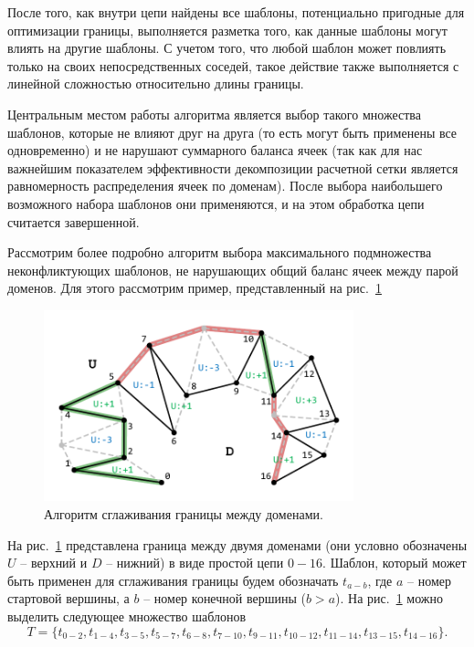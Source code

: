После того, как внутри цепи найдены все шаблоны, потенциально пригодные для оптимизации границы, выполняется разметка того, как данные шаблоны могут влиять на другие шаблоны.
С учетом того, что любой шаблон может повлиять только на своих непосредственных соседей, такое действие также выполняется с линейной сложностью относительно длины границы.

Центральным местом работы алгоритма является выбор такого множества шаблонов, которые не влияют друг на друга (то есть могут быть применены все одновременно) и не нарушают суммарного баланса ячеек (так как для нас важнейшим показателем эффективности декомпозиции расчетной сетки является равномерность распределения ячеек по доменам).
После выбора наибольшего возможного набора шаблонов они применяются, и на этом обработка цепи считается завершенной.

Рассмотрим более подробно алгоритм выбора максимального подмножества неконфликтующих шаблонов, не нарушающих общий баланс ячеек между парой доменов.
Для этого рассмотрим пример, представленный на рис.~\ref{fig:text_2_smooth_smooth}

\begin{figure}[ht]
\centering
\includegraphics[width=0.8\textwidth]{fig/par_smooth.pdf}
\singlespacing
{}\caption{Алгоритм сглаживания границы между доменами.}
\label{fig:text_2_smooth_smooth}
\end{figure}

На рис.~\ref{fig:text_2_smooth_smooth} представлена граница между двумя доменами (они условно обозначены $U$ -- верхний и $D$ -- нижний) в виде простой цепи $0-16$.
Шаблон, который может быть применен для сглаживания границы будем обозначать $t_{a-b}$, где $a$ -- номер стартовой вершины, а $b$ -- номер конечной вершины ($b > a$).
На рис.~\ref{fig:text_2_smooth_smooth} можно выделить следующее множество шаблонов
\begin{equation}
T = \{ t_{0-2}, t_{1-4}, t_{3-5}, t_{5-7}, t_{6-8}, t_{7-10}, t_{9-11}, t_{10-12}, t_{11-14}, t_{13-15}, t_{14-16} \}.
\end{equation}

